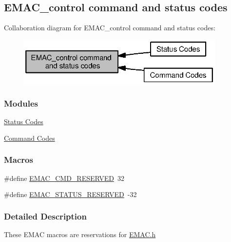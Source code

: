 \subsection{E\+M\+A\+C\+\_\+control command and status codes}
\label{group___e_m_a_c___c_o_n_t_r_o_l}
Collaboration diagram for E\+M\+A\+C\+\_\+control command and status codes\+:
\nopagebreak
\begin{figure}[H]
\begin{center}
\leavevmode
\includegraphics[width=295pt]{group___e_m_a_c___c_o_n_t_r_o_l}
\end{center}
\end{figure}
\subsubsection*{Modules}
\begin{DoxyCompactItemize}
\item 
\hyperlink{group___e_m_a_c___s_t_a_t_u_s}{Status Codes}
\item 
\hyperlink{group___e_m_a_c___c_m_d}{Command Codes}
\end{DoxyCompactItemize}
\subsubsection*{Macros}
\begin{DoxyCompactItemize}
\item 
\#define \hyperlink{group___e_m_a_c___c_o_n_t_r_o_l_ga56f3e93517d362f44d638f1e7ecbcfdb}{E\+M\+A\+C\+\_\+\+C\+M\+D\+\_\+\+R\+E\+S\+E\+R\+V\+E\+D}~32
\item 
\#define \hyperlink{group___e_m_a_c___c_o_n_t_r_o_l_gada65346f7e4d230ac1998870744f6161}{E\+M\+A\+C\+\_\+\+S\+T\+A\+T\+U\+S\+\_\+\+R\+E\+S\+E\+R\+V\+E\+D}~-\/32
\end{DoxyCompactItemize}


\subsubsection{Detailed Description}
These E\+M\+A\+C macros are reservations for \hyperlink{_e_m_a_c_8h}{E\+M\+A\+C.\+h} 

